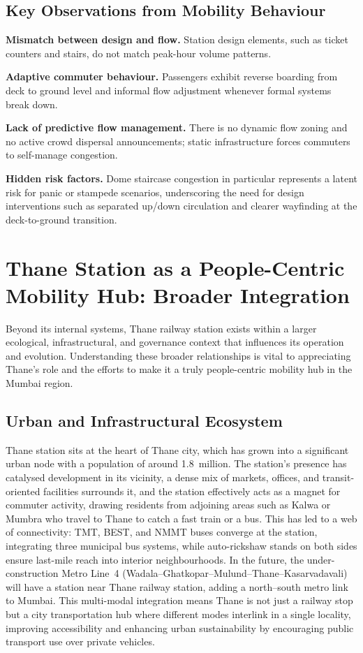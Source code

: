 \documentclass[11pt]{article}
\begin{document}
\subsection{Key Observations from Mobility Behaviour}

\textbf{Mismatch between design and flow.} Station design elements, such as ticket counters and
stairs, do not match peak-hour volume patterns.

\textbf{Adaptive commuter behaviour.} Passengers exhibit reverse boarding from deck to ground
level and informal flow adjustment whenever formal systems break down.

\textbf{Lack of predictive flow management.} There is no dynamic flow zoning and no active crowd
dispersal announcements; static infrastructure forces commuters to self-manage congestion.

\textbf{Hidden risk factors.} Dome staircase congestion in particular represents a latent risk
for panic or stampede scenarios, underscoring the need for design interventions such as
separated up/down circulation and clearer wayfinding at the deck-to-ground transition.

\section{Thane Station as a People-Centric Mobility Hub: Broader Integration}

Beyond its internal systems, Thane railway station exists within a larger ecological,
infrastructural, and governance context that influences its operation and evolution.
Understanding these broader relationships is vital to appreciating Thane's role and the efforts
to make it a truly people-centric mobility hub in the Mumbai region.

\subsection{Urban and Infrastructural Ecosystem}

Thane station sits at the heart of Thane city, which has grown into a significant urban node
with a population of around 1.8~million. The station's presence has catalysed development in
its vicinity, a dense mix of markets, offices, and transit-oriented facilities surrounds it,
and the station effectively acts as a magnet for commuter activity, drawing residents from
adjoining areas such as Kalwa or Mumbra who travel to Thane to catch a fast train or a bus. This
has led to a web of connectivity: TMT, BEST, and NMMT buses converge at the station, integrating
three municipal bus systems, while auto-rickshaw stands on both sides ensure last-mile reach into
interior neighbourhoods. In the future, the under-construction Metro Line~4
(Wadala--Ghatkopar--Mulund--Thane--Kasarvadavali) will have a station near Thane railway station,
adding a north--south metro link to Mumbai. This multi-modal integration means Thane is not just
a railway stop but a city transportation hub where different modes interlink in a single
locality, improving accessibility and enhancing urban sustainability by encouraging public
transport use over private vehicles.
\end{document}
